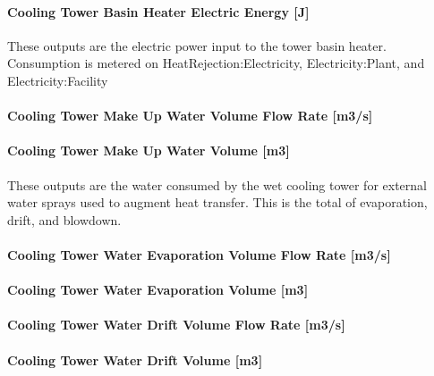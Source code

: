 \paragraph{Cooling Tower Basin Heater Electric Energy {[}J{]}}\label{cooling-tower-basin-heater-electric-energy-j-2}

These outputs are the electric power input to the tower basin heater. Consumption is metered on HeatRejection:Electricity, Electricity:Plant, and Electricity:Facility

\paragraph{Cooling Tower Make Up Water Volume Flow Rate {[}m3/s{]}}\label{cooling-tower-make-up-water-volume-flow-rate-m3s-2}

\paragraph{Cooling Tower Make Up Water Volume {[}m3{]}}\label{cooling-tower-make-up-water-volume-m3-2}

These outputs are the water consumed by the wet cooling tower for external water sprays used to augment heat transfer. This is the total of evaporation, drift, and blowdown.

\paragraph{Cooling Tower Water Evaporation Volume Flow Rate {[}m3/s{]}}\label{cooling-tower-water-evaporation-volume-flow-rate-m3s-2}

\paragraph{Cooling Tower Water Evaporation Volume {[}m3{]}}\label{cooling-tower-water-evaporation-volume-m3-2}

\paragraph{Cooling Tower Water Drift Volume Flow Rate {[}m3/s{]}}\label{cooling-tower-water-drift-volume-flow-rate-m3s-2}

\paragraph{Cooling Tower Water Drift Volume {[}m3{]}}\label{cooling-tower-water-drift-volume-m3-2}

